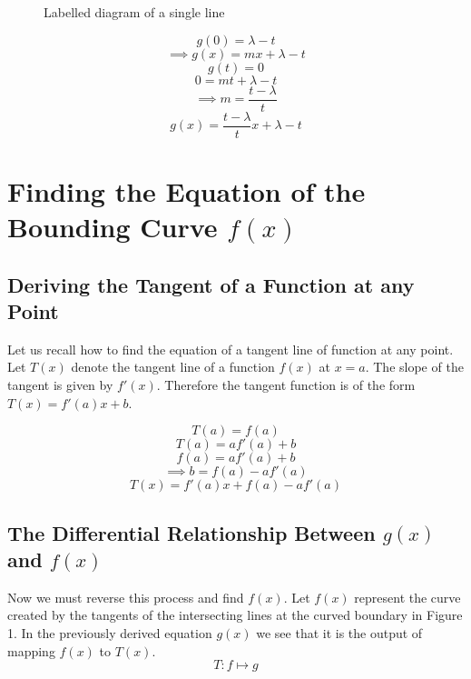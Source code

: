 \documentclass[12pt]{article}
\renewcommand\l[0]{\lambda}
\begin{document}
\begin{figure} 
    \vspace{1cm}
    \begin{center}
    \caption{Labelled diagram of a single line} 
    \end{center} 
\end{figure}

$$g(0) = \l-t$$
$$\implies g(x) = mx + \l-t$$
$$g(t) = 0$$
$$0=mt + \l-t$$
$$\implies m=\frac{t-\l}{t}$$
$$\boxed{g(x) = \frac{t-\l}{t}x + \l-t}$$

\vspace{4cm}

\section{Finding the Equation of the Bounding Curve $f(x)$}

\subsection{Deriving the Tangent of a Function at any Point}
Let us recall how to find the equation of a tangent line of function at any point.
Let $T(x)$ denote the tangent line of a function $f(x)$ at $x=a$. The slope of the tangent is given by $f'(x)$. Therefore the tangent function is of the form $T(x) = f'(a)x + b$.

$$T(a) = f(a)$$
$$T(a) = a f'(a) + b$$
$$f(a) = a f'(a) + b$$
$$\implies b=f(a)- a f'(a)$$
$$\boxed{T(x)=f'(a)x + f(a)- a f'(a)}$$

\subsection{The Differential Relationship Between $g(x)$ and $f(x)$}
Now we must reverse this process and find $f(x)$.
Let $f(x)$ represent the curve created by the tangents of the intersecting lines at the curved boundary in Figure 1. In the previously derived equation $g(x)$ we see that it is the output of mapping $f(x)$ to $T(x)$. 
$$T: f \mapsto g$$
\end{document}
